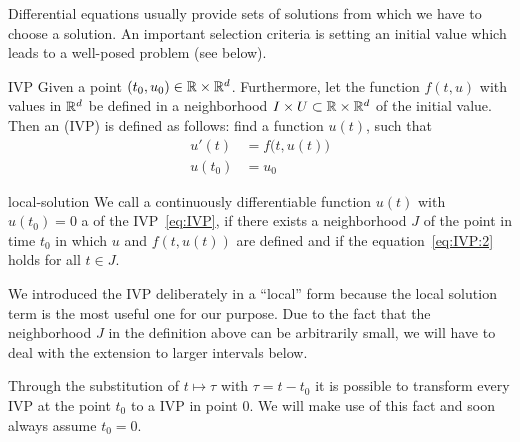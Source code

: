 Differential equations usually provide sets of solutions from which we
have to choose a solution. An important selection criteria is setting
an initial value which leads to a well-posed problem (see below).

\begin{Definition}{IVP}
   Given a point
  $(t_0,u_0)\in \mathbb R \times \mathbb R^d$.  Furthermore, let the function
  $f(t,u)$ with values in $\mathbb R^d$ be defined in a neighborhood
  $I\times U \subset \mathbb R\times \mathbb R^d$ of the initial value.  Then an
   (IVP) is defined as follows: find a
  function $u(t)$, such that
  \begin{subequations}
    \label{eq:IVP}
    \begin{align}
      \label{eq:IVP:2}
      u'(t)&=f\bigl(t,u(t)\bigr)
      \\
      \label{eq:IVP:3}
      u(t_0)&=u_0
  \end{align}
  \end{subequations}
\end{Definition}

\begin{Definition}{local-solution}
    \label{def:IVP:local solution}
   We call a continuously differentiable
  function $u(t)$ with $u(t_0) = 0$ a  of the
  IVP~\eqref{eq:IVP}, if there exists a neighborhood $J$ of the point
  in time $t_0$ in which $u$ and $f(t,u(t))$ are defined and if the
  equation~\eqref{eq:IVP:2} holds for all $t\in J$.
\end{Definition}

\begin{remark}
  We introduced the IVP deliberately in a ``local'' form because the
  local solution term is the most useful one for our purpose. Due to
  the fact that the neighborhood $J$ in the definition above can be
  arbitrarily small, we will have to deal with the extension to larger
  intervals below.
\end{remark}

\begin{remark}
  Through the substitution of $t\mapsto \tau$ with $\tau = t-t_0$ it
  is possible to transform every IVP at the point $t_0$ to a IVP in
  point $0$. We will make use of this fact and soon always assume
  $t_0 = 0$.
\end{remark}

